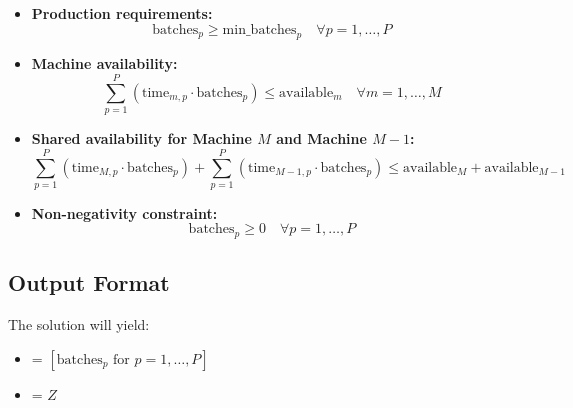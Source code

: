 \documentclass{article}
\begin{document}
\begin{itemize}
    \item \textbf{Production requirements:}
    \[
    \text{batches}_{p} \geq \text{min\_batches}_{p} \quad \forall p = 1,\ldots,P
    \]
    
    \item \textbf{Machine availability:}
    \[
    \sum_{p=1}^{P} (\text{time}_{m,p} \cdot \text{batches}_{p}) \leq \text{available}_{m} \quad \forall m = 1,\ldots,M
    \]
    
    \item \textbf{Shared availability for Machine \( M \) and Machine \( M-1 \):}
    \[
    \sum_{p=1}^{P} (\text{time}_{M,p} \cdot \text{batches}_{p}) + \sum_{p=1}^{P} (\text{time}_{M-1,p} \cdot \text{batches}_{p}) \leq \text{available}_{M} + \text{available}_{M-1}
    \]

    \item \textbf{Non-negativity constraint:}
    \[
    \text{batches}_{p} \geq 0 \quad \forall p = 1,\ldots,P
    \]
\end{itemize}

\subsection*{Output Format}
The solution will yield:
\begin{itemize}
    \item {} = $[\text{batches}_{p} \text{ for } p = 1, \ldots, P]$
    \item {} = $Z$
\end{itemize}
\end{document}
